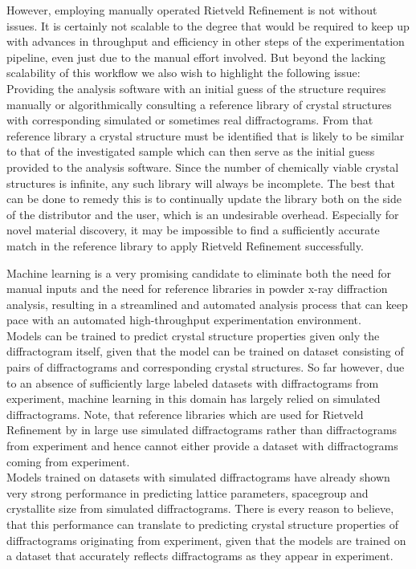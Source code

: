 However, employing manually operated Rietveld Refinement is not without issues.
It is certainly not scalable to the degree that would be required to keep up with advances
in throughput and efficiency in other steps of the experimentation pipeline, even just due to the manual effort involved.
But beyond the lacking scalability of this workflow we also wish to highlight the following issue:
Providing the analysis software with an initial guess of the structure requires manually or algorithmically
consulting a reference library of crystal structures with corresponding simulated or sometimes real diffractograms.
From that reference library a crystal structure must be identified that is likely to be similar
to that of the investigated sample which can then serve as the initial guess provided to the analysis software.
Since the number of chemically viable crystal structures is infinite, any such library will always be incomplete.
The best that can be done to remedy this is to continually update the library both on the side
of the distributor and the user, which is an undesirable overhead.
Especially for novel material discovery, it may be impossible to find a sufficiently accurate match in the reference
library to apply Rietveld Refinement successfully.

Machine learning is a very promising candidate to eliminate both the need for manual inputs and the need for reference
libraries in powder x-ray diffraction analysis, resulting in a streamlined and automated analysis process that can
keep pace with an automated high-throughput experimentation environment. \\

Models can be trained to predict crystal structure properties given only the diffractogram itself, given that
the model can be trained on dataset consisting of pairs of diffractograms and corresponding crystal structures.
So far however, due to an absence of sufficiently large labeled datasets with diffractograms from experiment,
machine learning in this domain has largely relied on simulated diffractograms.
Note, that reference libraries which are used for Rietveld Refinement by in large use simulated diffractograms
rather than diffractograms from experiment and hence cannot either provide a dataset with diffractograms coming
from experiment. \\

Models trained on datasets with simulated diffractograms have already shown very strong performance in predicting
lattice parameters, spacegroup and crystallite size from simulated diffractograms.
There is every reason to believe, that this performance can translate to predicting crystal structure properties
of diffractograms originating from experiment, given that the models are trained on a dataset that accurately
reflects diffractograms as they appear in experiment.\\



